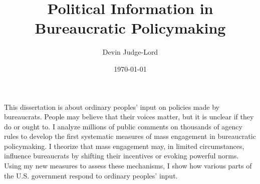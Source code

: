 \documentclass{article}
\title{Political Information in Bureaucratic Policymaking}
\author{Devin Judge-Lord} %
\date{\today}
\begin{document}
\maketitle

This dissertation is about ordinary peoples' input on policies made by bureaucrats. People may believe that their voices matter, but it is unclear if they do or ought to. I analyze millions of public comments on thousands of agency rules to develop the first systematic measures of mass engagement in bureaucratic policymaking. I theorize that mass engagement may, in limited circumstances, influence bureaucrats by shifting their incentives or evoking powerful norms. Using my new measures to assess these mechanisms, I show how various parts of the U.S. government respond to ordinary peoples' input.  %
\end{document}
